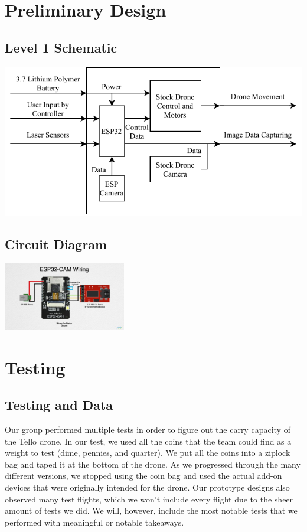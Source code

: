 \documentclass[12pt]{article}
\begin{document}
    \newpage
    \section{Preliminary Design}
        \subsection{Level 1 Schematic}
            \centerline{\includegraphics{./resources/level1.pdf}}
        \subsection{Circuit Diagram}
            \includegraphics[width=0.4\textwidth]{resources/esp32cam_wiring.jpg}
    
    \newpage
    \section{Testing}
        \subsection*{Testing and Data}
            Our group performed multiple tests in order to figure out the carry capacity of the Tello drone.
            In our test, we used all the coins that the team could find as a weight to test (dime, pennies, and quarter).
            We put all the coins into a ziplock bag and taped it at the bottom of the drone.
            As we progressed through the many different versions, we stopped using the coin bag and used the actual add-on devices that were originally intended for the drone.
            Our prototype designs also observed many test flights, which we won't include every flight due to the sheer amount of tests we did.
            We will, however, include the most notable tests that we performed with meaningful or notable takeaways.
\end{document}
